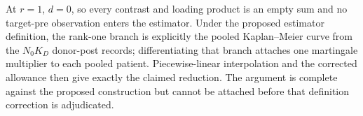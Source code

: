 At \(r=1\), \(d=0\), so every contrast and loading product is an empty sum and no target-pre observation enters the estimator.  Under the proposed estimator definition, the rank-one branch is explicitly the pooled Kaplan--Meier curve from the \(N_0K_D\) donor-post records; differentiating that branch attaches one martingale multiplier to each pooled patient.  Piecewise-linear interpolation and the corrected allowance then give exactly the claimed reduction.  The argument is complete against the proposed construction but cannot be attached before that definition correction is adjudicated.